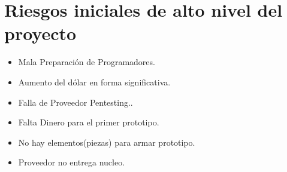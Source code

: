 \documentclass[11pt]{utalcaDoc}
\begin{document}
\section{Riesgos iniciales de alto nivel del proyecto}{

  \begin{itemize}
    \item{Mala Preparación de Programadores.}
    \item{Aumento del dólar en forma significativa.}
    \item{Falla de Proveedor Pentesting..}
    \item{Falta Dinero para el primer prototipo.}
    \item{No hay elementos(piezas) para armar prototipo.}
    \item{Proveedor no entrega nucleo.}
  \end{itemize}

}
\end{document}
